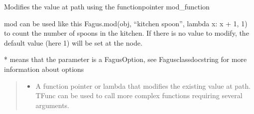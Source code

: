 \documentclass[a4paper,10pt,english]{sphinxmanual}
\begin{document}
\begin{fulllineitems}
\begin{fulllineitems}
\begin{quote}
\begin{description}
\begin{itemize}
\end{itemize}

\end{description}\end{quote}

\end{fulllineitems}


\begin{fulllineitems}
\label{\detokenize{fagus.fagus:fagus.fagus.Fagus.mod}}
\pysigstartsignatures
{}
\pysigstopsignatures
\sphinxAtStartPar
Modifies the value at path using the function\sphinxhyphen{}pointer mod\_function

\sphinxAtStartPar
mod can be used like this Fagus.mod(obj, “kitchen spoon”, lambda x: x + 1, 1) to count the number of spoons in
the kitchen. If there is no value to modify, the default value (here 1) will be set at the node.

\sphinxAtStartPar
* means that the parameter is a FagusOption, see Fagus\sphinxhyphen{}class\sphinxhyphen{}docstring for more information about options
\begin{quote}\begin{description}
\begin{itemize}
\item {}
\sphinxAtStartPar
{} \textendash{} A function pointer or lambda that modifies the existing value at path. TFunc can be used to
call more complex functions requiring several arguments.


\end{itemize}
\end{description}
\end{quote}
\end{fulllineitems}
\end{fulllineitems}
\end{document}
